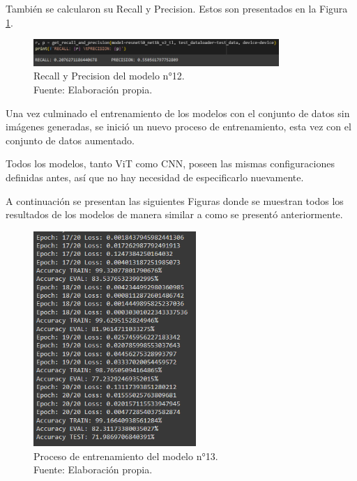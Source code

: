 También se calcularon su Recall y Precision. Estos son presentados en la Figura \ref{4:fig143}.

\begin{figure}[H]
	\begin{center}
		\includegraphics[width=0.83\textwidth]{4/figures/model12_rp.PNG}
		\caption[Recall y Precision del modelo n°12]{Recall y Precision del modelo n°12. \\
		Fuente: Elaboración propia.}
		\label{4:fig143}
	\end{center}
\end{figure}

Una vez culminado el entrenamiento de los modelos con el conjunto de datos sin imágenes generadas, se inició un nuevo proceso de entrenamiento, esta vez con el conjunto de datos aumentado. 

Todos los modelos, tanto ViT como CNN, poseen las mismas configuraciones definidas antes, así que no hay necesidad de especificarlo nuevamente.

A continuación se presentan las siguientes Figuras donde se muestran todos los resultados de los modelos de manera similar a como se presentó anteriormente.

\begin{figure}[H]
	\begin{center}
		\includegraphics[width=0.55\textwidth]{4/figures/model13_train.PNG}
		\caption[Proceso de entrenamiento del modelo n°13]{Proceso de entrenamiento del modelo n°13. \\
		Fuente: Elaboración propia.}
		\label{4:fig144}
	\end{center}
\end{figure}

